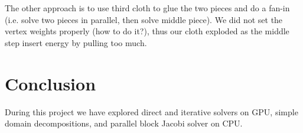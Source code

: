 \documentclass{article}
\begin{document}
The other approach is to use third cloth to glue the two pieces and do a
fan-in (i.e. solve two pieces in parallel, then solve middle piece). We did
not set the vertex weights properly (how to do it?), thus our cloth exploded
as the middle step insert energy by pulling too much.


\section{Conclusion}
During this project we have explored direct and iterative solvers on GPU,
simple domain decompositions, and parallel block Jacobi solver on CPU.


{}

\end{document}
